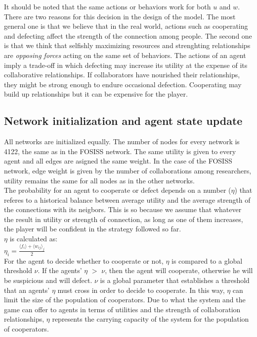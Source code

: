 \documentclass[11pt]{article}
\begin{document}
{\color{red} It should be noted that the same actions or behaviors work for
  both $u$ and $w$. There are two reasons for this decision in the design of the
model. The most general one is that we believe that in the real world,
actions such as cooperating and defecting affect the strength of the connection
among people. The second one is that we think that selfishly maximizing resources and
strenghting relationships are \emph{opposing forces} acting on the same set of
behaviors. The actions of an agent imply a trade-off in which defecting may
increase its utility at the expense of its collaborative relationships. If
collaborators have nourished their relationships, they might be strong enough to
endure occasional defection. Cooperating may build up relationships but it can be
expensive for the player.}

\subsection{Network initialization and agent state update}

All networks are initialized equally. The number of nodes for every network is 4122, the same as in the FOSISS network.
The same utility is given to every agent and all edges are asigned the same weight. In the case of the FOSISS
network, edge weight is given by the number of collaborations among researchers, utility remains the same for all nodes as in
the other networks.\\

The probability for an agent to cooperate or defect depends on a
number ($\eta$) that referes to a historical balance between average utility and
the average strength of the connections with its neigbors.   {\color{red} This is so
  because we assume that whatever the result in utility or strength of
  connection, as long as one of them increases, the player will be confident in
  the strategy followed so far}.\\ 


$\eta$ is calculated as:\\ 


$\eta_i = \frac{\langle f_i \rangle + \langle w_{ij} \rangle _j}{2}$\\

{\color{red} For the agent to decide whether to cooperate or not, $\eta$ is
  compared to a global threshold $\nu$. If the agents' $\eta$ $>$ $\nu$,
  then the agent will cooperate, otherwise he will be suspicious and will
  defect. $\nu$ is a global parameter that establishes a threshold that an
  agents' $\eta$ must cross in order to decide to cooperate. In this way,
  $\eta$ can limit the size of the population of cooperators. Due
  to what the system and the game can offer to agents in terms of utilities and the strength
  of collaboration relationships, $\eta$ represents the carrying capacity of the
  system for the population of cooperators}.  
\end{document}
